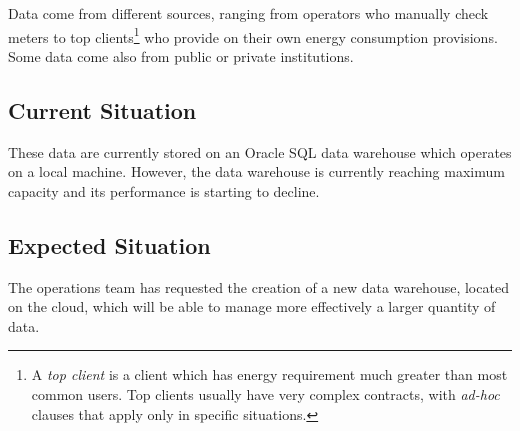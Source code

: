     Data come from different sources, ranging from operators who manually check meters to top clients\footnote{
        A \textit{top client} is a client which has energy requirement much greater than most common users.
        Top clients usually have very complex contracts, with \textit{ad-hoc} clauses that apply only in specific situations.\label{footnote:top_clients}
    } who provide on their own energy consumption provisions.
    Some data come also from public or private institutions.
\subsection{Current Situation}
    These data are currently stored on an Oracle SQL data warehouse which operates on a local machine.
    However, the data warehouse is currently reaching maximum capacity and its performance is starting to decline.
\subsection{Expected Situation}
    The operations team has requested the creation of a new data warehouse, located on the cloud, which will be able to manage more effectively a larger quantity of data.
        
        
    